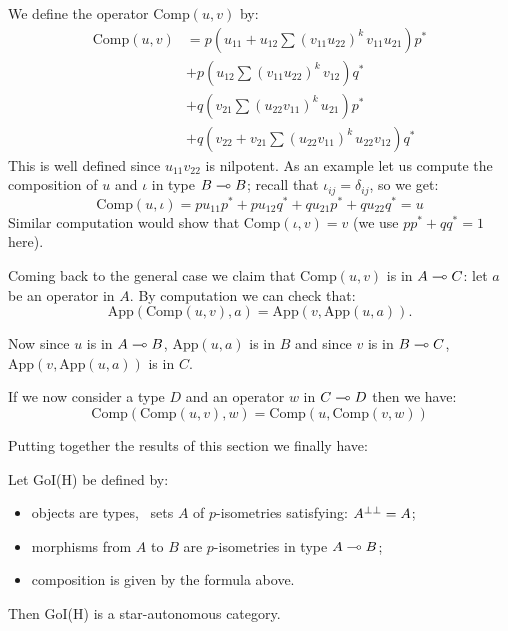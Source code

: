 We define the operator \(\mathrm{Comp}(u, v)\) by:
\begin{align*}
    \mathrm{Comp}(u, v) & = p(u_{11} + u_{12}\sum(v_{11}u_{22})^k\,v_{11}u_{21})p^*\\
                        & + p(u_{12}\sum(v_{11}u_{22})^k\,v_{12})q^*\\
                        & + q(v_{21}\sum(u_{22}v_{11})^k\,u_{21})p^*\\
			& + q(v_{22} + v_{21}\sum(u_{22}v_{11})^k\,u_{22}v_{12})q^*
\end{align*}
This is well defined since \(u_{11}v_{22}\) is nilpotent. As an example
let us compute the composition of \(u\) and \(\iota\) in type
\(B\multimap B\); recall that \(\iota_{ij} = \delta_{ij}\), so we get:
\begin{equation*}
\mathrm{Comp}(u, \iota) = pu_{11}p^* + pu_{12}q^* + qu_{21}p^* + qu_{22}q^*  = u
\end{equation*}
Similar computation would show that \(\mathrm{Comp}(\iota, v) = v\) (we
use \(pp^* + qq^* = 1\) here).

Coming back to the general case we claim that \(\mathrm{Comp}(u, v)\) is
in \(A\multimap C\): let \(a\) be an operator in \(A\). By computation we
can check that:
\begin{equation*}
\mathrm{App}(\mathrm{Comp}(u, v), a) = \mathrm{App}(v, \mathrm{App}(u, a)).
\end{equation*}

Now since \(u\) is in \(A\multimap B\), \(\mathrm{App}(u, a)\) is in \(B\)
and since \(v\) is in \(B\multimap C\),
\(\mathrm{App}(v, \mathrm{App}(u, a))\) is in \(C\).

If we now consider a type \(D\) and an operator \(w\) in \(C\multimap D\)
then we have:
\begin{equation*}
\mathrm{Comp}(\mathrm{Comp}(u, v), w) = \mathrm{Comp}(u, \mathrm{Comp}(v, w))
\end{equation*}

Putting together the results of this section we finally have:

\begin{theorem}
Let GoI(H) be defined by:
\begin{itemize}
\item objects are types, \ie\ sets $A$ of $p$-isometries satisfying: $A^{\bot\bot} = A$;
\item morphisms from $A$ to $B$ are $p$-isometries in type $A\multimap B$;
\item composition is given by the formula above.
\end{itemize}
Then GoI(H) is a star-autonomous category.
\end{theorem}


